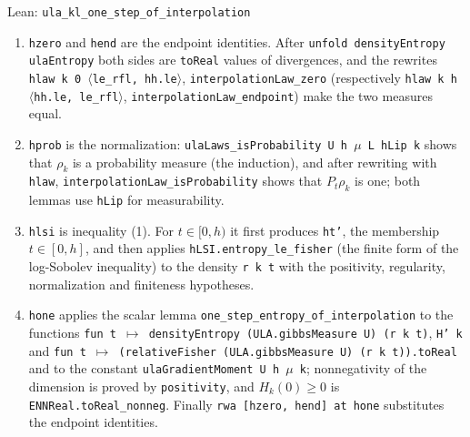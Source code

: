 \documentclass[11pt,a4paper]{article}
\begin{document}
\begin{leanbox}{Lean: \texttt{ula\_\allowbreak{}kl\_\allowbreak{}one\_\allowbreak{}step\_\allowbreak{}of\_\allowbreak{}interpolation}}
\begin{enumerate}
\item \texttt{hzero} and \texttt{hend} are the endpoint identities. After \texttt{unfold density\allowbreak{}Entropy ula\allowbreak{}Entropy} both sides are \texttt{to\allowbreak{}Real} values of divergences, and the rewrites \texttt{hlaw k 0 \ensuremath{\langle}le\_\allowbreak{}rfl, hh.\allowbreak{}le\ensuremath{\rangle}}, \texttt{interpolation\allowbreak{}Law\_\allowbreak{}zero} (respectively \texttt{hlaw k h \ensuremath{\langle}hh.\allowbreak{}le, le\_\allowbreak{}rfl\ensuremath{\rangle}}, \texttt{interpolation\allowbreak{}Law\_\allowbreak{}endpoint}) make the two measures equal.

\item \texttt{hprob} is the normalization: \texttt{ula\allowbreak{}Laws\_\allowbreak{}is\allowbreak{}Probability U h \ensuremath{\mu} L h\allowbreak{}Lip k} shows that \(\rho_k\) is a probability measure (the induction), and after rewriting with \texttt{hlaw}, \texttt{interpolation\allowbreak{}Law\_\allowbreak{}is\allowbreak{}Probability} shows that \(P_t\rho_k\) is one; both lemmas use \texttt{h\allowbreak{}Lip} for measurability.

\item \texttt{hlsi} is inequality (1). For \(t\in[0,h)\) it first produces \texttt{ht'}, the membership \(t\in[0,h]\), and then applies \texttt{h\allowbreak{}LSI.\allowbreak{}entropy\_\allowbreak{}le\_\allowbreak{}fisher} (the finite form of the log-Sobolev inequality) to the density \texttt{r k t} with the positivity, regularity, normalization and finiteness hypotheses.

\item \texttt{hone} applies the scalar lemma \texttt{one\_\allowbreak{}step\_\allowbreak{}entropy\_\allowbreak{}of\_\allowbreak{}interpolation} to the functions \texttt{fun t \ensuremath{\mapsto} density\allowbreak{}Entropy (ULA.\allowbreak{}gibbs\allowbreak{}Measure U) (r k t)}, \texttt{H' k} and \texttt{fun t \ensuremath{\mapsto} (relative\allowbreak{}Fisher (ULA.\allowbreak{}gibbs\allowbreak{}Measure U) (r k t)).\allowbreak{}to\allowbreak{}Real} and to the constant \texttt{ula\allowbreak{}Gradient\allowbreak{}Moment U h \ensuremath{\mu} k}; nonnegativity of the dimension is proved by \texttt{positivity}, and \(H_k(0)\ge0\) is \texttt{ENNReal.\allowbreak{}to\allowbreak{}Real\_\allowbreak{}nonneg}. Finally \texttt{rwa [hzero, hend] at hone} substitutes the endpoint identities.

\end{enumerate}
\end{leanbox}
\end{document}
